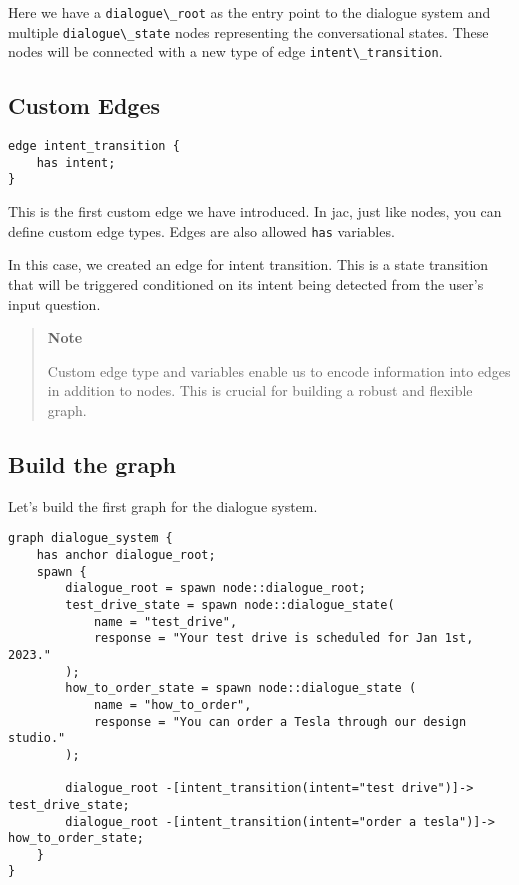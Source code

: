 Here we have a \passthrough{\lstinline!dialogue\_root!} as the entry
point to the dialogue system and multiple
\passthrough{\lstinline!dialogue\_state!} nodes representing the
conversational states. These nodes will be connected with a new type of
edge \passthrough{\lstinline!intent\_transition!}.

\hypertarget{custom-edges}{%
\subsection{Custom Edges}\label{custom-edges}}

\begin{lstlisting}
edge intent_transition {
    has intent;
}
\end{lstlisting}

This is the first custom edge we have introduced. In jac, just like
nodes, you can define custom edge types. Edges are also allowed
\passthrough{\lstinline!has!} variables.

In this case, we created an edge for intent transition. This is a state
transition that will be triggered conditioned on its intent being
detected from the user's input question.

\begin{quote}
\textbf{Note}

Custom edge type and variables enable us to encode information into
edges in addition to nodes. This is crucial for building a robust and
flexible graph.
\end{quote}

\hypertarget{build-the-graph-1}{%
\subsection{Build the graph}\label{build-the-graph-1}}

Let's build the first graph for the dialogue system.

\begin{lstlisting}
graph dialogue_system {
    has anchor dialogue_root;
    spawn {
        dialogue_root = spawn node::dialogue_root;
        test_drive_state = spawn node::dialogue_state(
            name = "test_drive",
            response = "Your test drive is scheduled for Jan 1st, 2023."
        );
        how_to_order_state = spawn node::dialogue_state (
            name = "how_to_order",
            response = "You can order a Tesla through our design studio."
        );

        dialogue_root -[intent_transition(intent="test drive")]-> test_drive_state;
        dialogue_root -[intent_transition(intent="order a tesla")]-> how_to_order_state;
    }
}
\end{lstlisting}

